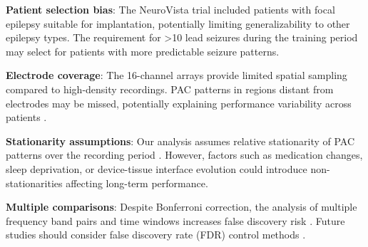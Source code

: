\textbf{Patient selection bias}: The NeuroVista trial \cite{Kuhlmann2018SeizurePA} included patients with focal epilepsy suitable for implantation, potentially limiting generalizability to other epilepsy types. The requirement for >10 lead seizures during the training period may select for patients with more predictable seizure patterns.

\textbf{Electrode coverage}: The 16-channel arrays provide limited spatial sampling compared to high-density recordings. PAC patterns in regions distant from electrodes may be missed, potentially explaining performance variability across patients \cite{Hussein2019HumanIEAQ}.

\textbf{Stationarity assumptions}: Our analysis assumes relative stationarity of PAC patterns over the recording period \cite{Rakowska2021LongTEQ}. However, factors such as medication changes, sleep deprivation, or device-tissue interface evolution could introduce non-stationarities affecting long-term performance.

\textbf{Multiple comparisons}: Despite Bonferroni correction, the analysis of multiple frequency band pairs and time windows increases false discovery risk \cite{Jensen2016DiscriminatingVFR,Aru2014UntanglingCCD}. Future studies should consider false discovery rate (FDR) control methods \cite{PintoOrellana2023StatisticalIFF}.






